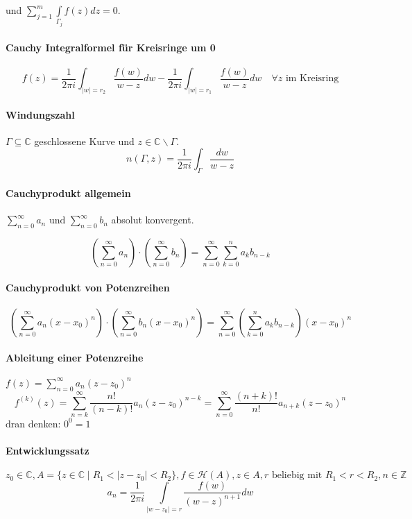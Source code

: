 \documentclass[a4paper, 10pt, DIV20, headings=small]{scrartcl}
\theoremstyle{definition}
\theoremstyle{plain}
\begin{document}
und $\sum\limits_{j=1}^m{\int\limits_{\Gamma_j}{f(z) dz}} = 0$.

\paragraph{Cauchy Integralformel für Kreisringe um 0}
$$f(z) = \frac{1}{2 \pi i} \int_{|w|=r_2} \frac{f(w)}{w-z} dw - \frac{1}{2 \pi i} \int_{|w|=r_1} \frac{f(w)}{w-z} dw \quad \forall z \text{ im Kreisring}$$

\paragraph{Windungszahl}
$\Gamma \subseteq \mathbb{C}$ geschlossene Kurve und $z \in \mathbb{C} \backslash \Gamma$.
$$n(\Gamma, z) = \frac{1}{2 \pi i} \int_\Gamma \frac{dw}{w-z}$$


\paragraph{Cauchyprodukt allgemein}
$\sum\limits_{n=0}^{\infty}a_n \text{ und } \sum\limits_{n=0}^{\infty}b_n$ absolut konvergent.

$$\left (\sum\limits_{n=0}^{\infty}a_n \right ) \cdot \left (\sum\limits_{n=0}^{\infty}b_n\right ) = \sum\limits_{n=0}^{\infty}{\sum\limits_{k=0}^n{a_k b_{n-k}}}$$

\paragraph{Cauchyprodukt von Potenzreihen}
$$\left( \sum\limits_{n=0}^{\infty}{a_n (x-x_0)^n} \right) \cdot 
\left( \sum\limits_{n=0}^{\infty}{b_n (x-x_0)^n} \right) =
\sum\limits_{n=0}^{\infty} \left( \sum\limits_{k=0}^n{a_k b_{n-k}} \right) (x-x_0)^n$$

\paragraph{Ableitung einer Potenzreihe} $f(z) = \sum\limits_{n=0}^{\infty}{a_n (z-z_0)^n}$
$$f^{(k)}(z) = \sum\limits_{n=k}^{\infty}{\frac{n!}{(n-k)!} a_n (z-z_0)^{n-k}} = \sum\limits_{n=0}^{\infty}{\frac{(n+k)!}{n!} a_{n+k} (z-z_0)^n}$$
dran denken: $0^0 = 1$

\paragraph{Entwicklungssatz}
$z_0 \in \mathbb{C}, A = \{z \in \mathbb{C} \mid R_1 < |z-z_0| < R_2 \}, f \in \mathcal{H}(A), z \in A, r \text{ beliebig mit } R_1 < r < R_2, n \in \mathbb{Z}$
$$a_n = \frac{1}{2 \pi i} \int\limits_{|w-z_0| = r} {\frac{f(w)}{(w-z)^{n+1}} dw}$$
\end{document}
